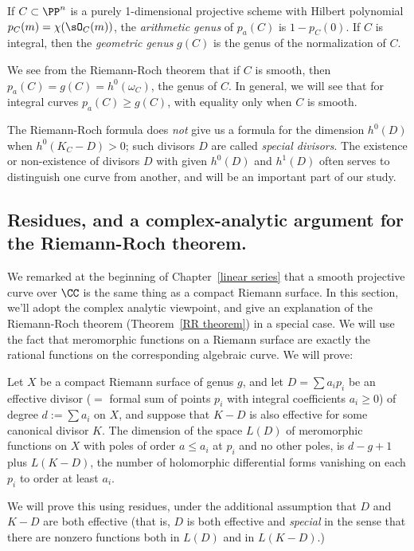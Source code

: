 \begin{definition}\label{genus Hilbert}\label{pa}\label{genus formula}
If $C\subset \PP^n$ is a purely 1-dimensional projective scheme with Hilbert polynomial
$p_C(m) = \chi(\sO_C(m))$, the \emph{arithmetic genus} of $p_a(C)$ is $1-p_C(0)$. If $C$ is integral, then
the \emph{geometric genus} $g(C)$ is the genus of the normalization of $C$.
\end{definition}
We see from the Riemann-Roch theorem that if $C$ is smooth, then $p_a(C) = g(C) = h^0(\omega_C)$, the genus of $C$. In general, we
will see that for integral curves $p_a(C) \geq g(C)$, with equality only when $C$ is smooth.
 
The Riemann-Roch formula does \emph{not} give us a formula for the dimension $h^0(D)$ when $h^0(K_C - D)>0$; such divisors $D$ are called \emph{special divisors}. The existence or non-existence of divisors $D$ with given $h^{0}(D)$ and $h^{1}(D)$ often serves to distinguish one curve from another, and will be an important part of our study.

\subsection{Residues, and a complex-analytic argument for the Riemann-Roch theorem.}\label{RR by residues}

We remarked at the beginning of Chapter~\ref{linear series} that a smooth projective curve over $\CC$ is the same thing as a compact Riemann surface. In this section, we'll adopt the complex analytic viewpoint, and give an explanation of the Riemann-Roch theorem  (Theorem~\ref{RR theorem}) in a special case. We will use the fact that meromorphic functions on a Riemann surface are exactly the rational functions on the corresponding
algebraic curve. We will prove:

\begin{theorem}
Let $X$ be a compact Riemann surface of genus $g$, and let $D = \sum a_i p_i$ be an effective divisor ($=$ formal sum of points $p_i$ with integral coefficients $a_i\geq 0$) of degree $d:= \sum a_i$ on $X$, and suppose that $K-D$ is also effective for some canonical divisor $K$.
The dimension of the space $L(D)$ of meromorphic functions on $X$ with poles of order $a\leq a_i$ at $p_i$ and no other poles, is
$d-g+1$ plus $L(K-D)$, the number of holomorphic differential forms vanishing on each $p_i$ to order at least $a_i$. 
\end{theorem}

We will prove this using residues, under the additional assumption that  $D$ and $K-D$ are both effective (that is, $D$ is both effective and \emph{special} in the sense that there are nonzero functions
both in $L(D)$ and in $L(K-D)$.)

